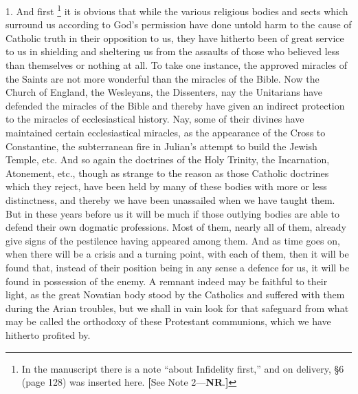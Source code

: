1. And first \footnote{In the manuscript there is a note ``about
Infidelity first,'' and on delivery, §6 (page 128) was inserted here. \textbf{[}See
Note 2—\textbf{NR}.\textbf{]}} it is obvious that while the various religious bodies and sects
which surround us according to God's permission have done untold harm
to the cause of Catholic truth in their opposition to us, they have
hitherto been of great service to us in shielding and sheltering us
from the assaults of those who believed less than themselves or
nothing at all. To take one instance, the approved miracles of
the Saints are not more wonderful than the miracles of the Bible. Now
the Church of England, the Wesleyans, the Dissenters, nay the
Unitarians have defended the miracles of the Bible and thereby have
given an indirect protection to the miracles of ecclesiastical
history. Nay, some of their divines have maintained certain
ecclesiastical miracles, as the appearance of the Cross to
Constantine, the subterranean fire in Julian's attempt to build the
Jewish Temple, etc. And so again the doctrines of the Holy Trinity,
the Incarnation, Atonement, etc., though as strange to the reason as
those Catholic doctrines which they reject, have been held by many of
these bodies with more or less distinctness, and thereby we have been
unassailed when we have taught them. But in these years before us it
will be much if those outlying bodies are able to defend their own
dogmatic professions. Most of them, nearly all of them, already give
signs of the pestilence having appeared among them. And as time goes
on, when there will be a crisis and a turning point, with each of
them, then it will be found that, instead of their position being in
any sense a defence for us, it will be found in possession of the
enemy. A remnant indeed may be faithful to their light, as the great
Novatian body stood by the Catholics and suffered with them during the
Arian troubles, but we shall in vain look for that safeguard from what
may be called the orthodoxy of these Protestant communions, which we
have hitherto profited by.

